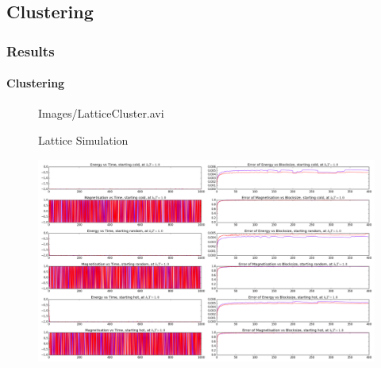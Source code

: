 \documentclass[11pt,notes]{beamer}
\begin{document}
\subsection{Clustering}
\begin{frame}
\frametitle{Results}
\framesubtitle{Clustering}
	\begin{figure}
	\centering
	{Images/LatticeCluster.avi}
	\caption{Lattice Simulation}
	\end{figure}
\end{frame}
\begin{frame}
	\begin{figure}
		\centering
		\includegraphics[width=1.0\textwidth]{Images/C1}
	\end{figure}
\end{frame}
\end{document}
